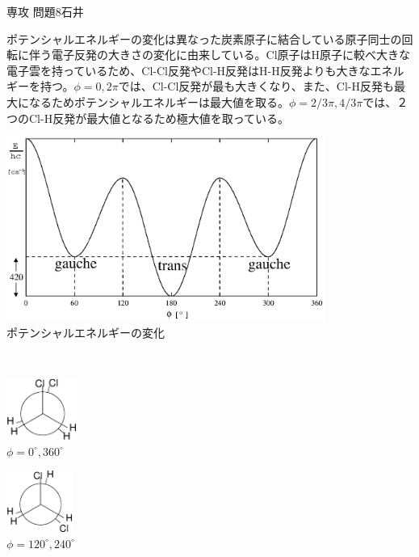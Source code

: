 \documentclass[fleqn]{jbook}
\begin{document}
\begin{answer}{専攻 問題8}{石井}
\begin{subanswers}
\begin{subsubanswers}
ポテンシャルエネルギーの変化は異なった炭素原子に結合している原子同士の回転に伴う電子反発の大きさの変化に由来している。Cl原子はH原子に較べ大きな電子雲を持っているため、Cl-Cl反発やCl-H反発はH-H反発よりも大きなエネルギーを持つ。$\phi = 0,2 \pi$では、Cl-Cl反発が最も大きくなり、また、Cl-H反発も最大になるためポテンシャルエネルギーは最大値を取る。$\phi=2/3 \pi, 4/3 \pi$では、２つのCl-H反発が最大値となるため極大値を取っている。\\
  \begin{center}
    \includegraphics[height=6cm]{1999phy8-10.eps}\\
    ポテンシャルエネルギーの変化
  \end{center}
~\\
 \begin{minipage}{\linewidth}
  \begin{center}
  \begin{minipage}{.2\linewidth}
   \begin{center}
    \includegraphics[height=2cm]{1999phy8-11.eps}\\
    $\phi = 0^\circ ,360^\circ$
   \end{center}
  \end{minipage}
  \begin{minipage}{.4\linewidth}
   \begin{center}
    \includegraphics[height=2cm]{1999phy8-12.eps}\\
	$\phi = 120^\circ ,240^\circ$
   \end{center}
  \end{minipage}
  \end{center}
 \end{minipage}\\



\end{subsubanswers}
\end{subanswers}
\end{answer}
\end{document}
